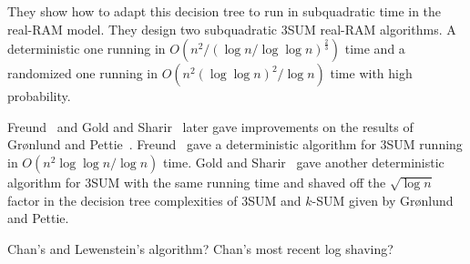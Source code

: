 They show how to adapt this decision tree to run in subquadratic time in the
real-RAM model. They design two subquadratic 3SUM
real-RAM algorithms. A deterministic one running in
$O(n^2/{(\log n/\log \log n)}^{\frac{2}{3}})$
time and a randomized one running in
$O(n^2 {(\log \log n)}^2 / \log n)$ time with high probability.

Freund~\cite{Fr15} and Gold and Sharir~\cite{GS15} later gave improvements on the
results of Gr{\o}nlund and Pettie~\cite{GP18}. Freund~\cite{Fr15} gave a deterministic algorithm for
3SUM running in \(O( {n^2\log \log n}/{\log n})\) time.
Gold and Sharir~\cite{GS15} gave another deterministic algorithm for 3SUM
with the same running time and shaved off the $\sqrt{\log n}$ factor in the
decision tree complexities of 3SUM and \(k\)-SUM given by Gr{\o}nlund and Pettie.

Chan's and Lewenstein's algorithm? Chan's most recent log shaving?
